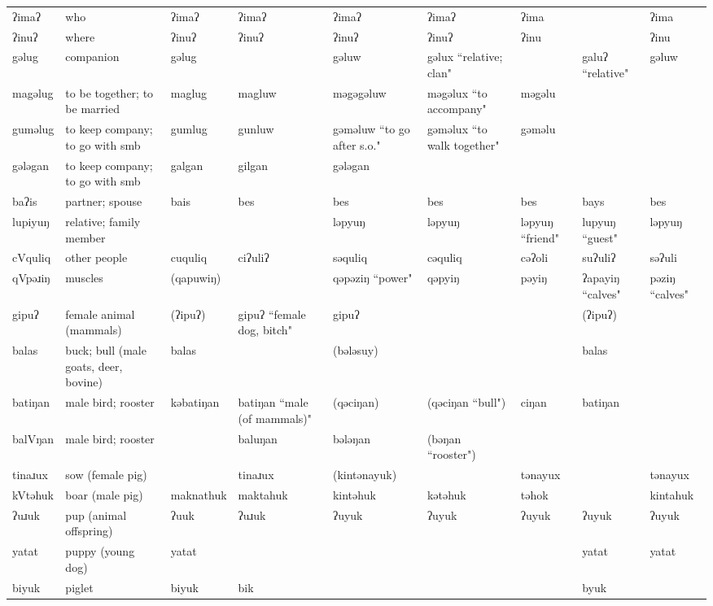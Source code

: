 \begin{landscape}
\begin{longtable}{*{9}{p{}}}
\text{*}ʔimaʔ & who & ʔimaʔ & ʔimaʔ & ʔimaʔ & ʔimaʔ & ʔima &  & ʔima\\
\text{*}ʔinuʔ & where & ʔinuʔ & ʔinuʔ & ʔinuʔ & ʔinuʔ & ʔinu &  & ʔinu\\
\text{*}gəlug & companion & gəlug &  & gəluw & gəlux ``relative; clan" &  & galuʔ ``relative" & gəluw\\
\text{*}magəlug & to be together; to be married & maglug & magluw & məgəgəluw & məgəlux ``to accompany" & məgəlu &  & \\
\text{*}guməlug & to keep company; to go with smb & gumlug & gunluw & gəməluw ``to go after s.o." & gəməlux ``to walk together" & gəməlu &  & \\
\text{*}gələgan & to keep company; to go with smb & galgan & gilgan & gələgan &  &  &  & \\
\text{*}baʔis & partner; spouse & bais & bes & bes & bes & bes & bays & bes\\
\text{*}lupiyuŋ & relative; family member &  &  & ləpyuŋ & ləpyuŋ & ləpyuŋ ``friend" & lupyuŋ ``guest" & ləpyuŋ\\
\text{*}cVquliq & other people & cuquliq & ciʔuliʔ & səquliq & cəquliq & cəʔoli & suʔuliʔ & səʔuli\\
\text{*}qVpəɹiŋ & muscles & (qapuwiŋ) &  & qəpəziŋ ``power" & qəpyiŋ & pəyiŋ & ʔapayiŋ ``calves" & pəziŋ ``calves"\\
\text{*}gipuʔ & female animal (mammals) & (ʔipuʔ) & gipuʔ ``female dog, bitch" & gipuʔ &  &  & (ʔipuʔ) & \\
\text{*}balas & buck; bull (male goats, deer, bovine) & balas &  & (bələsuy) &  &  & balas & \\
\text{*}batiŋan & male bird; rooster & kəbatiŋan & batiŋan ``male (of mammals)" & (qəciŋan) & (qəciŋan ``bull") & ciŋan & batiŋan & \\
\text{*}balVŋan & male bird; rooster &  & baluŋan & bələŋan & (bəŋan ``rooster") &  &  & \\
\text{*}tinaɹux & sow (female pig) &  & tinaɹux & (kintənayuk) &  & tənayux &  & tənayux\\
\text{*}kVtəhuk & boar (male pig) & maknathuk & maktahuk & kintəhuk & kətəhuk & təhok &  & kintahuk\\
\text{*}ʔuɹuk & pup (animal offspring) & ʔuuk & ʔuɹuk & ʔuyuk & ʔuyuk & ʔuyuk & ʔuyuk & ʔuyuk\\
\text{*}yatat & puppy (young dog) & yatat &  &  &  &  & yatat & yatat\\
\text{*}biyuk & piglet & biyuk & bik &  &  &  & byuk & \\

\end{longtable}
\end{landscape}
